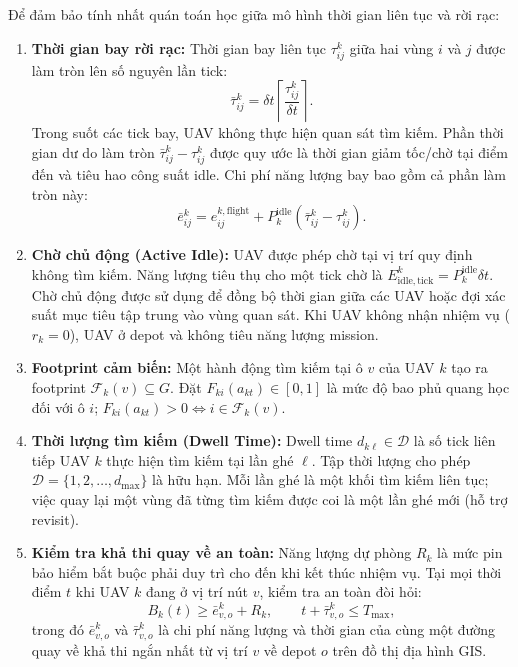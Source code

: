 \documentclass[12pt,a4paper]{article}
\begin{document}
Để đảm bảo tính nhất quán toán học giữa mô hình thời gian liên tục và rời rạc:
\begin{enumerate}
    \item \textbf{Thời gian bay rời rạc:} Thời gian bay liên tục $\tau^k_{ij}$ giữa hai vùng $i$ và $j$ được làm tròn lên số nguyên lần tick:
    \begin{equation}
    \bar\tau_{ij}^k = \delta t \left\lceil \frac{\tau_{ij}^k}{\delta t} \right\rceil.
    \end{equation}
    Trong suốt các tick bay, UAV không thực hiện quan sát tìm kiếm. Phần thời gian dư do làm tròn $\bar\tau_{ij}^k - \tau_{ij}^k$ được quy ước là thời gian giảm tốc/chờ tại điểm đến và tiêu hao công suất idle. Chi phí năng lượng bay bao gồm cả phần làm tròn này:
    \begin{equation}
    \bar{e}_{ij}^k = e_{ij}^{k,\mathrm{flight}} + P_k^{\mathrm{idle}}(\bar\tau_{ij}^k - \tau_{ij}^k).
    \end{equation}
    
    \item \textbf{Chờ chủ động (Active Idle):} UAV được phép chờ tại vị trí quy định không tìm kiếm. Năng lượng tiêu thụ cho một tick chờ là $E_{\mathrm{idle,tick}}^k = P_k^{\mathrm{idle}}\delta t$. Chờ chủ động được sử dụng để đồng bộ thời gian giữa các UAV hoặc đợi xác suất mục tiêu tập trung vào vùng quan sát. Khi UAV không nhận nhiệm vụ ($r_k = 0$), UAV ở depot và không tiêu năng lượng mission.
    
    \item \textbf{Footprint cảm biến:} Một hành động tìm kiếm tại ô $v$ của UAV $k$ tạo ra footprint $\mathcal{F}_k(v) \subseteq G$. Đặt $F_{ki}(a_{kt}) \in [0, 1]$ là mức độ bao phủ quang học đối với ô $i$; $F_{ki}(a_{kt}) > 0 \iff i \in \mathcal{F}_k(v)$.
    
    \item \textbf{Thời lượng tìm kiếm (Dwell Time):} Dwell time $d_{k\ell} \in \mathcal{D}$ là số tick liên tiếp UAV $k$ thực hiện tìm kiếm tại lần ghé $\ell$. Tập thời lượng cho phép $\mathcal{D} = \{1, 2, \ldots, d_{\max}\}$ là hữu hạn. Mỗi lần ghé là một khối tìm kiếm liên tục; việc quay lại một vùng đã từng tìm kiếm được coi là một lần ghé mới (hỗ trợ revisit).
    
    \item \textbf{Kiểm tra khả thi quay về an toàn:} Năng lượng dự phòng $R_k$ là mức pin bảo hiểm bắt buộc phải duy trì cho đến khi kết thúc nhiệm vụ. Tại mọi thời điểm $t$ khi UAV $k$ đang ở vị trí nút $v$, kiểm tra an toàn đòi hỏi:
    \begin{equation}
    B_k(t) \geq \bar{e}_{v, o}^k + R_k,\qquad t + \bar{\tau}_{v, o}^k \leq T_{\max},
    \end{equation}
    trong đó $\bar{e}_{v, o}^k$ và $\bar{\tau}_{v, o}^k$ là chi phí năng lượng và thời gian của cùng một đường quay về khả thi ngắn nhất từ vị trí $v$ về depot $o$ trên đồ thị địa hình GIS.
    

\end{enumerate}
\end{document}
